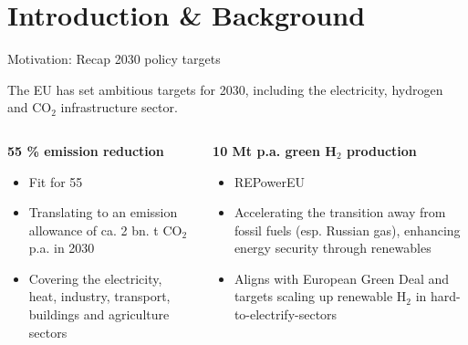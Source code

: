 \documentclass[10pt,aspectratio=169,dvipsnames]{beamer}
\begin{document}
\section{Introduction \& Background}
\begin{frame}{Motivation: Recap 2030 policy targets}
  \footnotesize

  The EU has set ambitious targets for 2030, including the electricity, hydrogen and CO$_2$ infrastructure sector.

  \begin{columns}[T] %
    \begin{column}{.3\textwidth}
        \begin{minipage}[t][.45\textheight]{\linewidth}
            \begin{alertblock}{\textbf{55 \% emission reduction}}
                \begin{itemize}
                  \item \alert{Fit for 55}
                  \item Translating to an emission allowance of ca. 2 bn. t CO$_2$ p.a. in 2030
                  \item Covering the electricity, heat, industry, transport, buildings and agriculture sectors \newline
                \end{itemize}
                \vspace{0.06cm}
            \end{alertblock}
        \end{minipage}
    \end{column}
    
    \begin{column}{.34\textwidth}
        \begin{minipage}[t][.45\textheight]{\linewidth}
            \begin{exampleblock}{\textbf{10 Mt p.a. green H$_2$ production}}
                \begin{itemize}
                  \item \alert{REPowerEU}
                  \item Accelerating the transition away from fossil fuels (esp. Russian gas), enhancing energy security through renewables
                  \item Aligns with European Green Deal and targets scaling up renewable H$_2$ in hard-to-electrify-sectors
                \end{itemize}
            \end{exampleblock}
        \end{minipage}
    \end{column}


\end{columns}
\end{frame}
\end{document}
